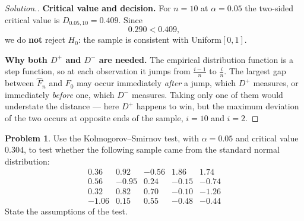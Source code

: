 \documentclass[11pt,a4paper]{article}
\theoremstyle{definition}
\newtheorem{problemx}{Problem}[section]
\newenvironment{problem}{\begin{problemx}}{\end{problemx}}
\newenvironment{solution}
  {\renewcommand{\qedsymbol}{}\begin{proof}[\textit{Solution}.]}
  {\end{proof}}
\begin{document}
\begin{solution}
\textbf{Critical value and decision.} For $n = 10$ at $\alpha = 0.05$ the
two-sided critical value is $D_{0.05,10} = 0.409$. Since
$$0.290 < 0.409,$$
we do \textbf{not} reject $H_0$: the sample is consistent with Uniform$[0,1]$.

\textbf{Why both $D^{+}$ and $D^{-}$ are needed.} The empirical distribution
function is a step function, so at each observation it jumps from
$\frac{i-1}{n}$ to $\frac{i}{n}$. The largest gap between $\widehat{F}_n$ and
$F_0$ may occur immediately \emph{after} a jump, which $D^{+}$ measures, or
immediately \emph{before} one, which $D^{-}$ measures. Taking only one of them
would understate the distance --- here $D^{+}$ happens to win, but the maximum
deviation of the two occurs at opposite ends of the sample, $i = 10$ and $i = 2$.
\end{solution}

\pagebreak
\begin{problem}
Use the Kolmogorov--Smirnov test, with $\alpha = 0.05$ and critical value $0.304$, to
test whether the following sample came from the standard normal distribution:
\[\begin{array}{rrrrr}
0.36 & 0.92 & -0.56 & 1.86 & 1.74\\
0.56 & -0.95 & 0.24 & -0.15 & -0.74\\
0.32 & 0.82 & 0.70 & -0.10 & -1.26\\
-1.06 & 0.15 & 0.55 & -0.48 & -0.44
\end{array}\]
State the assumptions of the test.
\end{problem}
\end{document}
